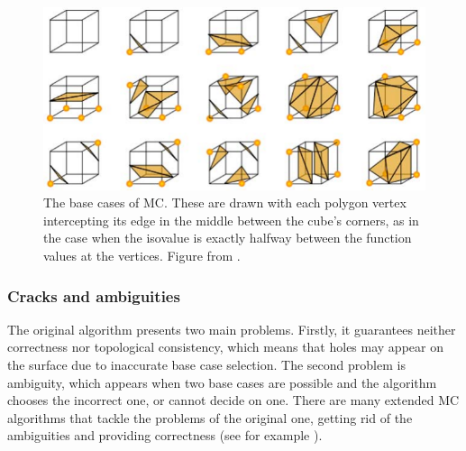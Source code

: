 \begin{figure}
\centering
   \includegraphics[width=.5\textwidth]{Pictures/cubes.pdf}
   \caption{The base cases of \ac{MC}. These are drawn with each polygon vertex intercepting its edge in the middle between the cube's corners, as in the case when the isovalue is exactly halfway between the function values at the vertices. Figure from \cite{Marching2006}.}
   \label{fig:MC_basecase}
\end{figure}

\subsubsection{Cracks and ambiguities}
The original algorithm presents two main problems. Firstly, it guarantees neither correctness nor topological consistency, which means that holes may appear on the surface due to inaccurate base case selection. The second problem is ambiguity, which appears when two base cases are possible and the algorithm chooses the incorrect one, or cannot decide on one. There are many extended \ac{MC} algorithms that tackle the problems of the original one, getting rid of the ambiguities and providing correctness (see for example \cite{ExtendedMC}).

